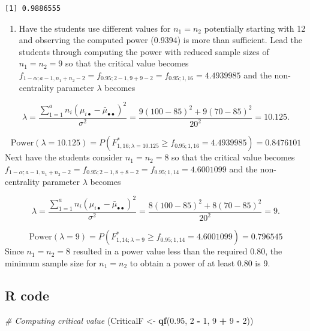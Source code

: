 \documentclass[
]{article}
\newenvironment{Shaded}{\begin{snugshade}}{\end{snugshade}}
\newcommand{\CommentTok}[1]{\textcolor[rgb]{0.56,0.35,0.01}{\textit{#1}}}
\newcommand{\DecValTok}[1]{\textcolor[rgb]{0.00,0.00,0.81}{#1}}
\newcommand{\FloatTok}[1]{\textcolor[rgb]{0.00,0.00,0.81}{#1}}
\newcommand{\FunctionTok}[1]{\textcolor[rgb]{0.13,0.29,0.53}{\textbf{#1}}}
\newcommand{\NormalTok}[1]{#1}
\newcommand{\OtherTok}[1]{\textcolor[rgb]{0.56,0.35,0.01}{#1}}
\newcommand{\SpecialCharTok}[1]{\textcolor[rgb]{0.81,0.36,0.00}{\textbf{#1}}}
\providecommand{\tightlist}{%
  \setlength{\itemsep}{0pt}\setlength{\parskip}{0pt}}
\begin{document}
\begin{verbatim}
[1] 0.9886555
\end{verbatim}

\begin{enumerate}
\def\labelenumi{\alph{enumi})}
\setcounter{enumi}{3}
\tightlist
\item
  Have the students use different values for \(n_1 = n_2\) potentially starting with 12 and observing the computed power (0.9394) is more than sufficient. Lead the students through computing the power with reduced sample sizes of \(n_1 = n_2 = 9\) so that the critical value becomes \(f_{1 - \alpha; a - 1, n_1 + n_2 -2} = f_{0.95; 2 - 1, 9 + 9 -2} = f_{0.95; 1, 16} = 4.4939985\) and the non-centrality parameter \(\lambda\) becomes
\end{enumerate}

\begin{equation*}
\lambda = \frac{\sum_{1 = 1}^an_i(\mu_{i\bullet} - \bar{\mu}_{\bullet\bullet})^2}{\sigma^2} = \frac{9(100 - 85)^2 + 9(70 - 85)^2}{20^2} = 10.125.
\end{equation*}

\[\text{Power}(\lambda = 10.125) = P(F^*_{1, 16; \lambda = 10.125} \geq f_{0.95; 1, 16} = 4.4939985) = 0.8476101\]
Next have the students consider \(n_1 = n_2 = 8\) so that the critical value becomes
\(f_{1 - \alpha; a - 1, n_1 + n_2 -2} = f_{0.95; 2 - 1, 8 + 8 -2} = f_{0.95; 1, 14} = 4.6001099\) and the non-centrality parameter \(\lambda\) becomes

\begin{equation*}
\lambda = \frac{\sum_{1 = 1}^an_i(\mu_{i\bullet} - \bar{\mu}_{\bullet\bullet})^2}{\sigma^2} = \frac{8(100 - 85)^2 + 8(70 - 85)^2}{20^2} = 9.
\end{equation*}

\[\text{Power}(\lambda = 9) = P(F^*_{1, 14; \lambda = 9} \geq f_{0.95; 1, 14} = 4.6001099) = 0.796545\]
Since \(n_1 = n_2 = 8\) resulted in a power value less than the required 0.80, the minimum sample size for \(n_1 = n_2\) to obtain a power of at least 0.80 is 9.

\hypertarget{r-code-1}{%
\subsection*{R code}\label{r-code-1}}

\begin{Shaded}
\begin{Highlighting}[]
\CommentTok{\# Computing critical value}
\NormalTok{(CriticalF }\OtherTok{\textless{}{-}} \FunctionTok{qf}\NormalTok{(}\FloatTok{0.95}\NormalTok{, }\DecValTok{2} \SpecialCharTok{{-}} \DecValTok{1}\NormalTok{, }\DecValTok{9} \SpecialCharTok{+} \DecValTok{9} \SpecialCharTok{{-}} \DecValTok{2}\NormalTok{))}
\end{Highlighting}
\end{Shaded}
\end{document}
